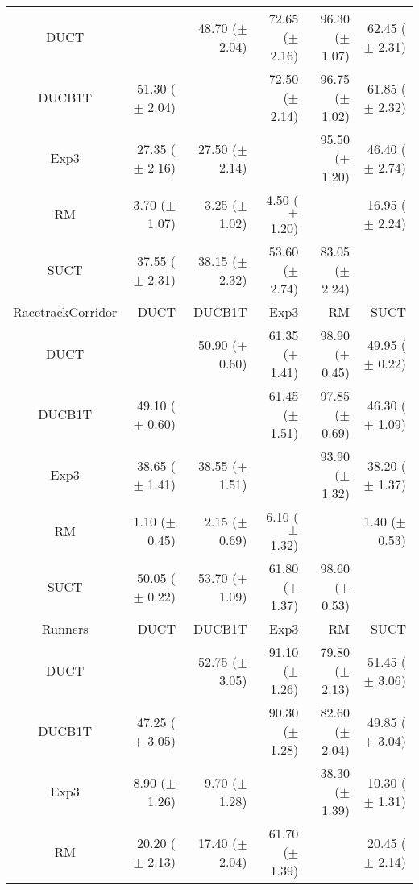 \documentclass{article}
\begin{document}
\begin{table}
\begin{center}
\begin{tabular}{|c|rrrrr|}
\hline
           DUCT    &              & 48.70 ($\pm$ 2.04)   & 72.65 ($\pm$ 2.16)   & 96.30 ($\pm$ 1.07)   & 62.45 ($\pm$ 2.31)   \\
         DUCB1T    & 51.30 ($\pm$ 2.04)   &              & 72.50 ($\pm$ 2.14)   & 96.75 ($\pm$ 1.02)   & 61.85 ($\pm$ 2.32)   \\
           Exp3    & 27.35 ($\pm$ 2.16)   & 27.50 ($\pm$ 2.14)   &              & 95.50 ($\pm$ 1.20)   & 46.40 ($\pm$ 2.74)   \\
             RM    & 3.70 ($\pm$ 1.07)   & 3.25 ($\pm$ 1.02)   & 4.50 ($\pm$ 1.20)   &              & 16.95 ($\pm$ 2.24)   \\
           SUCT    & 37.55 ($\pm$ 2.31)   & 38.15 ($\pm$ 2.32)   & 53.60 ($\pm$ 2.74)   & 83.05 ($\pm$ 2.24)   &              \\
\hline
\hline
RacetrackCorridor   &       DUCT   &     DUCB1T   &       Exp3   &         RM   &       SUCT   \\
\hline
           DUCT    &              & 50.90 ($\pm$ 0.60)   & 61.35 ($\pm$ 1.41)   & 98.90 ($\pm$ 0.45)   & 49.95 ($\pm$ 0.22)   \\
         DUCB1T    & 49.10 ($\pm$ 0.60)   &              & 61.45 ($\pm$ 1.51)   & 97.85 ($\pm$ 0.69)   & 46.30 ($\pm$ 1.09)   \\
           Exp3    & 38.65 ($\pm$ 1.41)   & 38.55 ($\pm$ 1.51)   &              & 93.90 ($\pm$ 1.32)   & 38.20 ($\pm$ 1.37)   \\
             RM    & 1.10 ($\pm$ 0.45)   & 2.15 ($\pm$ 0.69)   & 6.10 ($\pm$ 1.32)   &              & 1.40 ($\pm$ 0.53)   \\
           SUCT    & 50.05 ($\pm$ 0.22)   & 53.70 ($\pm$ 1.09)   & 61.80 ($\pm$ 1.37)   & 98.60 ($\pm$ 0.53)   &              \\
\hline
\hline
        Runners   &       DUCT   &     DUCB1T   &       Exp3   &         RM   &       SUCT   \\
\hline
           DUCT    &              & 52.75 ($\pm$ 3.05)   & 91.10 ($\pm$ 1.26)   & 79.80 ($\pm$ 2.13)   & 51.45 ($\pm$ 3.06)   \\
         DUCB1T    & 47.25 ($\pm$ 3.05)   &              & 90.30 ($\pm$ 1.28)   & 82.60 ($\pm$ 2.04)   & 49.85 ($\pm$ 3.04)   \\
           Exp3    & 8.90 ($\pm$ 1.26)   & 9.70 ($\pm$ 1.28)   &              & 38.30 ($\pm$ 1.39)   & 10.30 ($\pm$ 1.31)   \\
             RM    & 20.20 ($\pm$ 2.13)   & 17.40 ($\pm$ 2.04)   & 61.70 ($\pm$ 1.39)   &              & 20.45 ($\pm$ 2.14)   \\

\end{tabular}
\end{center}
\end{table}
\end{document}
